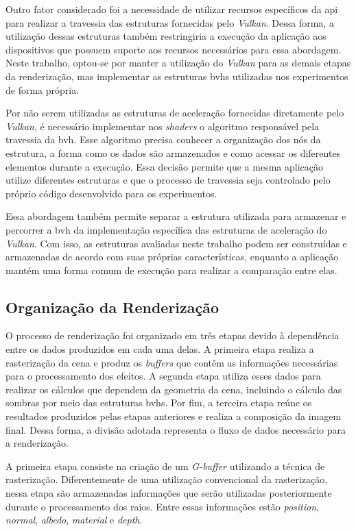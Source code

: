 Outro fator considerado foi a necessidade de utilizar recursos específicos da \gls{api} para realizar a travessia das estruturas fornecidas pelo \textit{Vulkan}. Dessa forma, a utilização dessas estruturas também restringiria a execução da aplicação aos dispositivos que possuem suporte aos recursos necessários para essa abordagem. Neste trabalho, optou-se por manter a utilização do \textit{Vulkan} para as demais etapas da renderização, mas implementar as estruturas \glspl{bvh} utilizadas nos experimentos de forma própria.

Por não serem utilizadas as estruturas de aceleração fornecidas diretamente pelo \textit{Vulkan}, é necessário implementar nos \textit{shaders} o algoritmo responsável pela travessia da \gls{bvh}. Esse algoritmo precisa conhecer a organização dos nós da estrutura, a forma como os dados são armazenados e como acessar os diferentes elementos durante a execução. Essa decisão permite que a mesma aplicação utilize diferentes estruturas e que o processo de travessia seja controlado pelo próprio código desenvolvido para os experimentos.

Essa abordagem também permite separar a estrutura utilizada para armazenar e percorrer a \gls{bvh} da implementação específica das estruturas de aceleração do \textit{Vulkan}. Com isso, as estruturas avaliadas neste trabalho podem ser construídas e armazenadas de acordo com suas próprias características, enquanto a aplicação mantém uma forma comum de execução para realizar a comparação entre elas.

\subsection{Organização da Renderização}

O processo de renderização foi organizado em três etapas devido à dependência entre os dados produzidos em cada uma delas. A primeira etapa realiza a rasterização da cena e produz os \textit{buffers} que contêm as informações necessárias para o processamento dos efeitos. A segunda etapa utiliza esses dados para realizar os cálculos que dependem da geometria da cena, incluindo o cálculo das sombras por meio das estruturas \glspl{bvh}. Por fim, a terceira etapa reúne os resultados produzidos pelas etapas anteriores e realiza a composição da imagem final. Dessa forma, a divisão adotada representa o fluxo de dados necessário para a renderização.

A primeira etapa consiste na criação de um \textit{G-buffer} utilizando a técnica de rasterização. Diferentemente de uma utilização convencional da rasterização, nessa etapa são armazenadas informações que serão utilizadas posteriormente durante o processamento dos raios. Entre essas informações estão \textit{position}, \textit{normal}, \textit{albedo}, \textit{material} e \textit{depth}.

